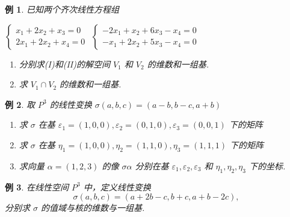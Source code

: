 \documentclass[13pt]{beamer}
\newtheorem{exa}{例}
\begin{document}
\begin{frame}
\begin{exa}已知两个齐次线性方程组
\begin{center}
 $\left\{\begin{array}{c}x_{1}+2 x_{2}+x_{3}=0 \\ 2 x_{1}+2 x_{2}+x_{4}=0\end{array}\right.$ \qquad
 $\left\{\begin{array}{l}-2 x_{1}+x_{2}+6 x_{3}-x_{4}=0 \\ -x_{1}+2 x_{2}+5 x_{3}-x_{4}=0\end{array}\right.$
\end{center}
\begin{enumerate}
\item 分别求(I)和(II)的解空间 $V_{1}$ 和 $V_{2}$ 的维数和一组基.

\item 求 $V_{1} \cap V_{2}$ 的维数和一组基.
\end{enumerate}
\end{exa}
\end{frame}


\setcounter{exa}{0}

\begin{frame}
\begin{exa}
	取 $P^{3}$ 的线性变换 $\sigma(a, b, c)=(a-b, b-c, a+b)$
	\begin{enumerate}
		\item  求 $\sigma$ 在基 $\varepsilon_{1}=(1,0,0), \varepsilon_{2}=(0,1,0), \varepsilon_{3}=(0,0,1)$ 下的矩阵
		\item  求 $\sigma$ 在基 $\eta_{1}=(1,0,0), \eta_{2}=(1,1,0), \eta_{3}=(1,1,1)$ 下的矩阵
		\item  求向量 $\alpha=(1,2,3)$ 的像 $\sigma \alpha$ 分别在基 $\varepsilon_{1}, \varepsilon_{2}, \varepsilon_{3}$ 和 $\eta_{1}, \eta_{2}, \eta_{3}$ 下的坐标.
	\end{enumerate}
\end{exa}
\end{frame}


\begin{frame}
\begin{exa}
	在线性空间 $P^{3}$ 中，定义线性变换 $$\sigma(a, b, c)=(a+2 b-c, b+c, a+b-2 c),$$ 分别求 $\sigma$ 的值域与核的维数与一组基.
\end{exa}
\end{frame}
\end{document}
